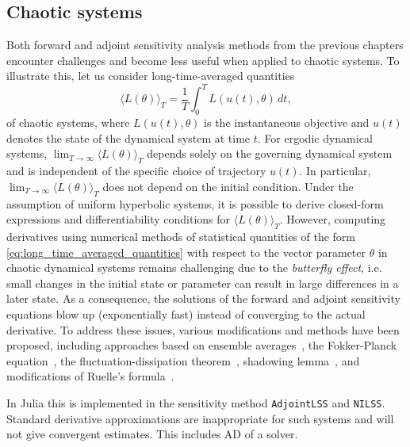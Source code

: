 \subsection{Chaotic systems}

Both forward and adjoint sensitivity analysis methods from the previous chapters encounter challenges and become less useful when applied to chaotic systems.
To illustrate this, let us consider long-time-averaged quantities 
\begin{equation}\label{eq:long_time_averaged_quantities}
    \langle L(\theta) \rangle_T = \frac{1}{T} \int_0^T L(u(t), \theta) \, dt, 
\end{equation}
of chaotic systems, where $L(u(t), \theta)$ is the instantaneous objective and $u(t)$ denotes the state of the dynamical system at time $t$.
For ergodic dynamical systems, $\lim_{T\to\infty} \langle L(\theta) \rangle_T$ depends solely on the governing dynamical system and is independent of the specific choice of trajectory $u(t)$. 
In particular, $\lim_{T\to\infty} \langle L(\theta) \rangle_T$ does not depend on the initial condition. 
Under the assumption of uniform hyperbolic systems, it is possible to derive closed-form expressions and differentiability conditions for $ \langle L(\theta) \rangle_T$\cite{ruelle1997differentiation,ruelle2009review}. 
However, computing derivatives using numerical methods of statistical quantities of the form \eqref{eq:long_time_averaged_quantities} with respect to the vector parameter $\theta$ in chaotic dynamical systems remains challenging due to the \textit{butterfly effect}, i.e. small changes in the initial state or parameter can result in large differences in a later state. 
As a consequence, the solutions of the forward and adjoint sensitivity equations blow up (exponentially fast) instead of converging to the actual derivative.
To address these issues, various modifications and methods have been proposed, including approaches based on ensemble averages~\cite{lea2000sensitivity, eyink2004ruelle}, the Fokker-Planck equation~\cite{thuburn2005climate, blonigan2014probability}, the fluctuation-dissipation theorem~\cite{leith1975climate, abramov2007blended, abramov2008new}, shadowing lemma~\cite{wang2013forward, wang2014least, wang2014convergence, ni2017sensitivity, blonigan2017adjoint, blonigan2018multiple, ni2019adjoint, ni2019sensitivity}, and modifications of Ruelle's formula~\cite{chandramoorthy2022efficient, ni2020fast}.

In Julia this is implemented in the sensitivity method \texttt{AdjointLSS} and \texttt{NILSS}. Standard derivative approximations are inappropriate for such systems and will not give convergent estimates. This includes AD of a solver.
